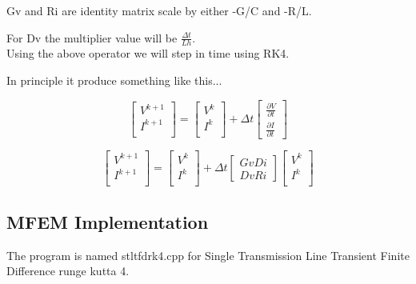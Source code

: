 \documentclass[12pt, letterpaper]{article}
\begin{document}
Gv and Ri are identity matrix scale by either -G/C and -R/L.

For Dv the multiplier value will be $\frac{\Delta t}{L h}$.\\

Using the above operator we will step in time using RK4.

In principle it produce something like this...


\begin{equation}
	\begin{bmatrix}
		V^{k+1} \\
		I^{k+1} \\
	\end{bmatrix}
	=
	\begin{bmatrix}
		V^k \\
		I^k \\
	\end{bmatrix}
	+
	\Delta t
	\begin{bmatrix}
		\frac{\partial{V}}{\partial{t}} \\
		\frac{\partial{I}}{\partial{t}} 
	\end{bmatrix}	
\end{equation}

\begin{equation}
	\begin{bmatrix}
		V^{k+1} \\
		I^{k+1} \\
	\end{bmatrix}
	=
	\begin{bmatrix}
		V^k \\
		I^k \\
	\end{bmatrix}
	+
	\Delta t
	\begin{bmatrix}
		Gv Di \\
		Dv Ri
	\end{bmatrix}
	\begin{bmatrix}
		V^k \\
		I^k \\
	\end{bmatrix}	
\end{equation}


\subsection{MFEM Implementation}

The program is named stltfdrk4.cpp for Single Transmission Line Transient Finite Difference runge kutta 4.
\end{document}
